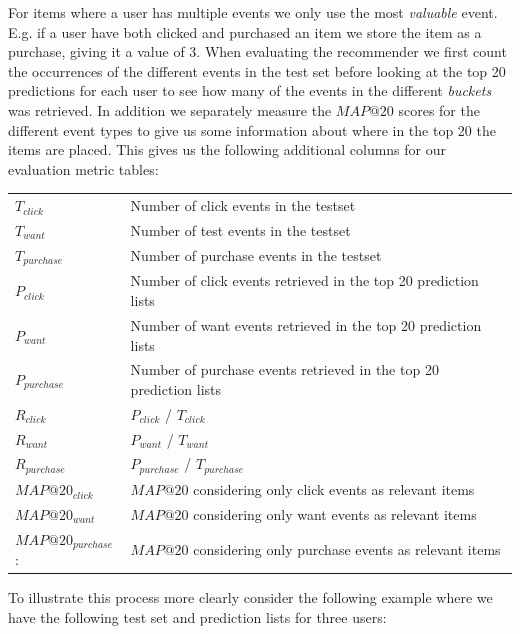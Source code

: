 For items where a user has multiple events we only use the most \emph{valuable} event. E.g. if a user have both clicked
and purchased an item we store the item as a purchase, giving it a value of 3. When evaluating the recommender we first count the
occurrences of the different events in the test set before looking at the top 20 predictions for each user to see how many of the events in the
different \emph{buckets} was retrieved. In addition we separately measure the $MAP@20$ scores for the different event types to give us some information
about where in the top 20 the items are placed. This gives us the following additional columns for our evaluation metric tables:

\begin{table}[H]
	\begin{tabular}{ll}
	\toprule
	$T_{click}$	 	 		& 	Number of click events in the testset \\
	$T_{want}$				&	Number of test events in the testset \\
	$T_{purchase}$	 		&	Number of purchase events in the testset \\
	$P_{click}$		 		&	Number of click events retrieved in the top 20 prediction lists \\
	$P_{want}$		 		&	Number of want events retrieved in the top 20 prediction lists \\
	$P_{purchase}$  		&	Number of purchase events retrieved in the top 20 prediction lists \\
	$R_{click}$				&	$P_{click}$ / $T_{click}$ \\
	$R_{want}$		 		&	$P_{want}$ / $T_{want}$  \\
	$R_{purchase}$	 		&	$P_{purchase}$ / $T_{purchase}$ \\
	$MAP@20_{click}$ 		&	$MAP@20$ considering only click events as relevant items \\
	$MAP@20_{want}$  		&	$MAP@20$ considering only want events as relevant items \\ 
	$MAP@20_{purchase}$: 	& 	$MAP@20$ considering only purchase events as relevant items \\
	\bottomrule
	\end{tabular}
\end{table}

To illustrate this process more clearly consider the following example where we have
the following test set and prediction lists for three users:

